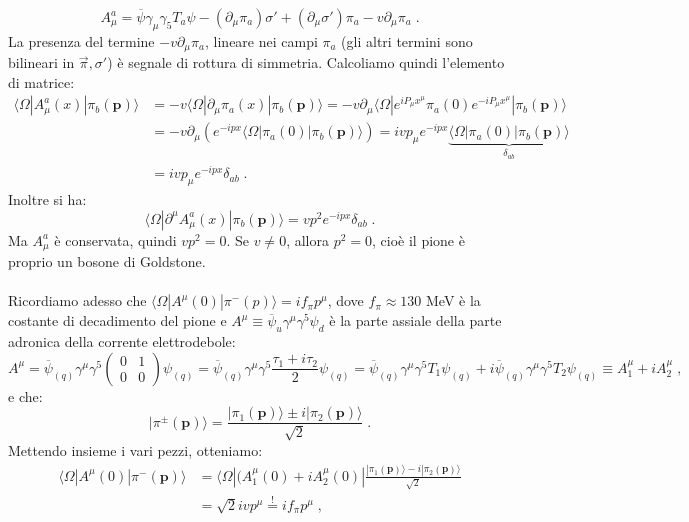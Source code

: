\documentclass[12pt,a4paper]{article}
\theoremstyle{definition}
\newcommand{\bra}{\langle}
\newcommand{\ket}{\rangle}
\numberwithin{equation}{section}
\begin{document}
\begin{equation}
A_{\mu}^a=\overline{\psi}\gamma_{\mu}\gamma_5T_a\psi-(\partial_{\mu}\pi_a)\sigma'+(\partial_{\mu}\sigma')\pi_a-v\partial_{\mu}\pi_a\;.
\end{equation}
La presenza del termine $-v\partial_{\mu}\pi_a$, lineare nei campi $\pi_a$ (gli altri termini sono bilineari in $\vec{\pi},\sigma'$) è segnale di  rottura di simmetria. Calcoliamo quindi l'elemento di matrice:
\begin{align*}
\bra\Omega|A_{\mu}^a(x)|\pi_b(\mathbf{p})\ket &= -v\bra\Omega|\partial_{\mu}\pi_a(x)|\pi_b(\mathbf{p})\ket=-v\partial_{\mu}\bra\Omega|e^{iP_{\mu}x^{\mu}}\pi_a(0)e^{-iP_{\mu}x^{\mu}}|\pi_b(\mathbf{p})\ket \\
&= -v\partial_{\mu}\left(e^{-ipx}\bra\Omega|\pi_a(0)|\pi_b(\mathbf{p})\ket\right)=ivp_{\mu}e^{-ipx}\underbrace{\bra\Omega|\pi_a(0)|\pi_b(\mathbf{p})\ket}_{\delta_{ab}} \\
&= ivp_{\mu}e^{-ipx}\delta_{ab}\;.
\end{align*}
Inoltre si ha:
$$
\bra\Omega|\partial^{\mu}A^a_{\mu}(x)|\pi_b(\mathbf{p})\ket=vp^2e^{-ipx}\delta_{ab}\;.
$$
Ma $A_{\mu}^a$ è conservata, quindi $vp^2=0$. Se $v\ne 0$, allora $p^2=0$, cioè il pione è proprio un bosone di Goldstone. \\
\\
Ricordiamo adesso che $\bra\Omega|A^{\mu}(0)|\pi^-(p)\ket=if_{\pi}p^{\mu}$, dove $f_{\pi}\approx 130$ MeV è la costante di decadimento del pione e $A^{\mu}\equiv \overline{\psi}_u\gamma^{\mu}\gamma^5\psi_d$ è la parte assiale della parte adronica della corrente elettrodebole:
\begin{equation}
A^{\mu}=\overline{\psi}_{(q)}\gamma^{\mu}\gamma^5\left(\begin{matrix}
0 & 1 \\
0 & 0
\end{matrix}\right)\psi_{(q)}=\overline{\psi}_{(q)}\gamma^{\mu}\gamma^5\frac{\tau_1+i\tau_2}{2}\psi_{(q)}=\overline{\psi}_{(q)}\gamma^{\mu}\gamma^5T_1\psi_{(q)}+i\overline{\psi}_{(q)}\gamma^{\mu}\gamma^5T_2\psi_{(q)}\equiv A^{\mu}_1+iA^{\mu}_2\;,
\end{equation}
e che:
$$
|\pi^{\pm}(\mathbf{p})\ket=\frac{|\pi_1(\mathbf{p})\ket\pm i|\pi_2(\mathbf{p})\ket}{\sqrt{2}}\;.
$$
Mettendo insieme i vari pezzi, otteniamo:
\begin{align*}
\bra\Omega|A^{\mu}(0)|\pi^-(\mathbf{p})\ket &= \bra\Omega|(A_1^{\mu}(0)+iA_2^{\mu}(0)|\frac{|\pi_1(\mathbf{p})\ket-i|\pi_2(\mathbf{p})\ket}{\sqrt{2}} \\
&= \sqrt{2}ivp^{\mu}\stackrel{!}{=}if_{\pi}p^{\mu}\;,
\end{align*}
\end{document}
